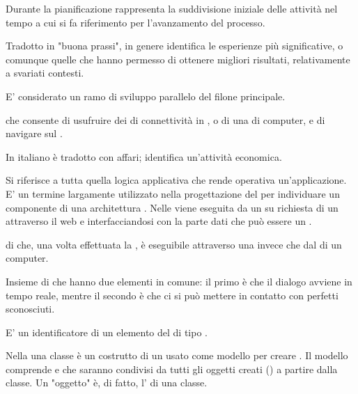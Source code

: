 {Durante la pianificazione rappresenta la suddivisione iniziale delle attività nel tempo a cui si fa riferimento per l'avanzamento del processo.}

{Tradotto in "buona prassi", in genere identifica le esperienze più significative, o comunque quelle che hanno permesso di ottenere migliori risultati, relativamente a svariati contesti.}

{E' considerato un ramo di sviluppo parallelo del filone principale.}

{ che consente di usufruire dei  di connettività in , o di una  di computer, e di navigare sul .}


{In italiano è tradotto con affari; identifica un'attività economica.}


{Si riferisce a tutta quella logica applicativa che rende operativa un'applicazione. E' un termine largamente utilizzato nella progettazione del  per individuare un componente  di una architettura . Nelle     viene eseguita da un  su richiesta di un  attraverso il    web e interfacciandosi con la parte dati che può essere un .}



{ di  che, una volta effettuata la , è eseguibile attraverso una  invece che dal  di un computer.}


{Insieme di  che hanno due elementi in comune: il primo è che il dialogo avviene in tempo reale, mentre il secondo è che ci si può mettere in contatto con perfetti sconosciuti.}

{E' un identificatore di un elemento del  di tipo .}

{Nella   una classe è un costrutto di un  usato come modello per creare . Il modello comprende  e  che saranno condivisi da tutti gli oggetti creati () a partire dalla classe. Un "oggetto" è, di fatto, l' di una classe.}

